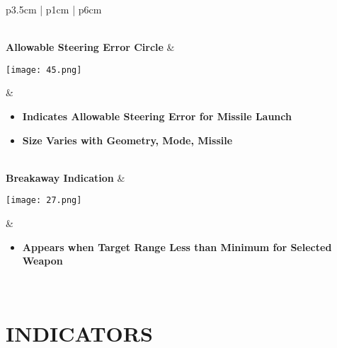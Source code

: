\documentclass[fontMetropolis]{TechCheck}
\begin{document}
\begin{center}
\begin{longtable}{p{3.5cm} | p{1cm} |  p{6cm}}
\begin{minipage}[t]{\linewidth}
\begin{itemize}
\begin{itemize}
					\end{itemize}
				\end{itemize}
			\end{minipage} \\
			\midrule
			\textbf{Allowable Steering Error Circle} &
			\begin{minipage}[t]{\linewidth}
				\vspace{-7pt}
				\centering
				\texttt{[image: 45.png]}
			\end{minipage} &
			\begin{minipage}[t]{\linewidth}
				\vspace{-7pt}
				\begin{itemize}
					\item \textbf{Indicates Allowable Steering Error for Missile Launch}
					\item \textbf{Size Varies with Geometry, Mode, Missile}
				\end{itemize}
			\end{minipage} \\
			\midrule
			\textbf{Breakaway Indication} &
			\begin{minipage}[t]{\linewidth}
				\vspace{-7pt}
				\centering
				\texttt{[image: 27.png]}
			\end{minipage} &
			\begin{minipage}[t]{\linewidth}
				\vspace{-7pt}
				\begin{itemize}
					\item \textbf{Appears when Target Range Less than Minimum for Selected Weapon}
				\end{itemize}
			\end{minipage} \\
			\bottomrule
		\end{longtable}
	\end{center}

	\clearpage

	\section{INDICATORS}
\end{document}

